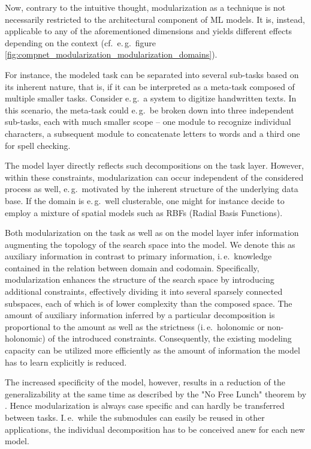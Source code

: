 Now, contrary to the intuitive thought, modularization as a technique is not necessarily restricted to the architectural component of ML models. It is, instead, applicable to any of the aforementioned dimensions and yields different effects depending on the context (cf.\ e.\,g.\ figure \ref{fig:compnet_modularization_modularization_domains}).

For instance, the modeled task can be separated into several sub-tasks based on its inherent nature, that is, if it can be interpreted as a meta-task composed of multiple smaller tasks. Consider e.\,g.\ a system to digitize handwritten texts. In this scenario, the meta-task could e.\,g.\ be broken down into three independent sub-tasks, each with much smaller scope -- one module to recognize individual characters, a subsequent module to concatenate letters to words and a third one for spell checking.

The model layer directly reflects such decompositions on the task layer. However, within these constraints, modularization can occur independent of the considered process as well, e.\,g.\ motivated by the inherent structure of the underlying data base. If the domain is e.\,g.\ well clusterable, one might for instance decide to employ a mixture of spatial models such as RBFs (Radial Basis Functions).

Both modularization on the task as well as on the model layer infer information augmenting the topology of the search space into the model. We denote this as auxiliary information in contrast to primary information, i.\,e.\ knowledge contained in the relation between domain and codomain. Specifically, modularization enhances the structure of the search space by introducing additional constraints, effectively dividing it into several sparsely connected subspaces, each of which is of lower complexity than the composed space. The amount of auxiliary information inferred by a particular decomposition is proportional to the amount as well as the strictness (i.\,e.\ holonomic or non-holonomic) of the introduced constraints. Consequently, the existing modeling capacity can be utilized more efficiently as the amount of information the model has to learn explicitly is reduced.

The increased specificity of the model, however, results in a reduction of the generalizability at the same time as described by the "No Free Lunch" theorem by \cite{Wolpert1997-fu}. Hence modularization is always case specific and can hardly be transferred between tasks. I.\,e.\, while the submodules can easily be reused in other applications, the individual decomposition has to be conceived anew for each new model.


